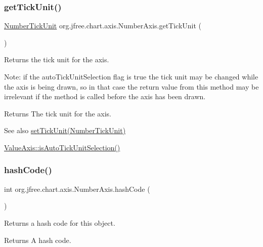 \subsubsection{\texorpdfstring{get\+Tick\+Unit()}{getTickUnit()}}
{\footnotesize\ttfamily \mbox{\hyperlink{classorg_1_1jfree_1_1chart_1_1axis_1_1_number_tick_unit}{Number\+Tick\+Unit}} org.\+jfree.\+chart.\+axis.\+Number\+Axis.\+get\+Tick\+Unit (\begin{DoxyParamCaption}{ }\end{DoxyParamCaption})}

Returns the tick unit for the axis. 

Note\+: if the {\ttfamily auto\+Tick\+Unit\+Selection} flag is {\ttfamily true} the tick unit may be changed while the axis is being drawn, so in that case the return value from this method may be irrelevant if the method is called before the axis has been drawn.

\begin{DoxyReturn}{Returns}
The tick unit for the axis.
\end{DoxyReturn}
\begin{DoxySeeAlso}{See also}
\mbox{\hyperlink{classorg_1_1jfree_1_1chart_1_1axis_1_1_number_axis_a0990c55ae7683e249177ce3382ddc2e3}{set\+Tick\+Unit(\+Number\+Tick\+Unit)}} 

\mbox{\hyperlink{classorg_1_1jfree_1_1chart_1_1axis_1_1_value_axis_adc265a92cee6f4f50dcf0701f86d3cab}{Value\+Axis\+::is\+Auto\+Tick\+Unit\+Selection()}} 
\end{DoxySeeAlso}
\mbox{\label{classorg_1_1jfree_1_1chart_1_1axis_1_1_number_axis_acbf178f91cfc8f49182236b5f1873265}} 
\subsubsection{\texorpdfstring{hash\+Code()}{hashCode()}}
{\footnotesize\ttfamily int org.\+jfree.\+chart.\+axis.\+Number\+Axis.\+hash\+Code (\begin{DoxyParamCaption}{ }\end{DoxyParamCaption})}

Returns a hash code for this object.

\begin{DoxyReturn}{Returns}
A hash code. 
\end{DoxyReturn}
\mbox{\label{classorg_1_1jfree_1_1chart_1_1axis_1_1_number_axis_af7fbc7cfa74ffab183a5e4780b58d730}} 
